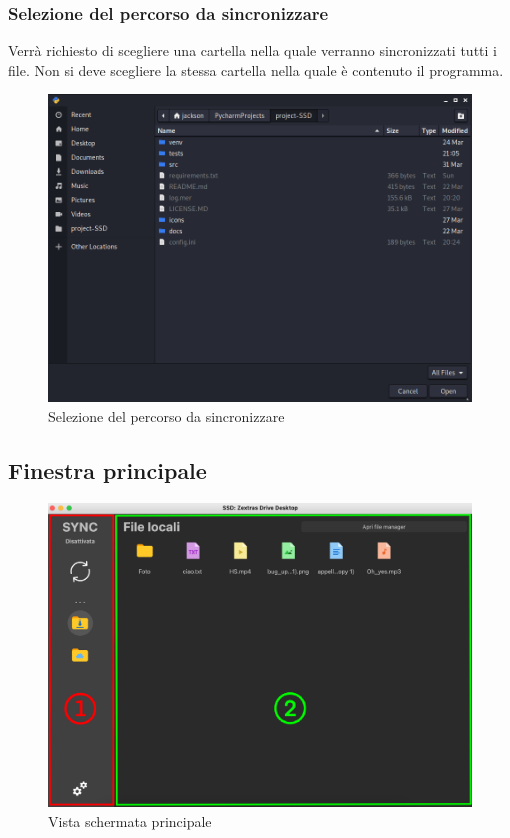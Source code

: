 \subsubsection{Selezione del percorso da sincronizzare}
\label{sec:selezionepath}
Verrà richiesto di scegliere una cartella nella quale verranno sincronizzati tutti i file. Non si deve scegliere la stessa cartella nella quale è contenuto il programma.
\begin{figure}[H]
    \centering
    \includegraphics[scale = 0.30]{components/img/selezione-path.png}
    \caption{Selezione del percorso da sincronizzare}
    \label{fig:Selezione del percorso da sincronizzare}
\end{figure}


\subsection{Finestra principale}

\begin{figure}[H]
    \centering
    \includegraphics[scale = 0.7]{components/img/Principale.png}
    \caption{Vista schermata principale}
    \label{fig:fileSync}
\end{figure}

